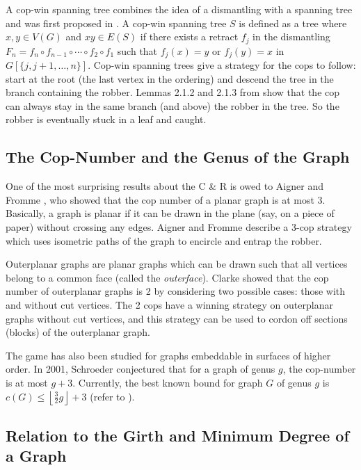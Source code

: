 A cop-win spanning tree combines the idea of a dismantling with a spanning tree
and was first proposed in \cite{clarke2002constrained}. A cop-win spanning tree $S$ is defined as a tree where $x,y\in V(G)$ and $xy \in E(S)$ if there exists a retract $f_j$ in the dismantling
$F_n = f_{n} \circ f_{n-1} \circ \cdots \circ f_{2} \circ f_1$ such that $f_j (x) = y$ or $f_j (y) = x$ in $G[\{j, j+1, \dots, n \}]$. Cop-win spanning trees give a strategy for the cops to follow: start at the root
(the last vertex in the ordering) and descend the tree in the branch containing the robber.
Lemmas 2.1.2 and 2.1.3 from \cite{clarke2002constrained} show that the cop
can always stay in the same branch (and above) the robber in the tree. So the
robber is eventually stuck in a leaf and caught.

\subsection{The Cop-Number and the Genus of the Graph}\label{intro cops and genus}

One of the most surprising results about the C \& R is owed to Aigner and Fromme \cite{aigner1984game}, who showed that the cop number of a planar graph is at most 3.
Basically, a graph is planar if it can be drawn in the plane (say, on a piece of paper) without crossing any edges. Aigner and Fromme describe a 3-cop strategy which uses isometric paths of the graph to encircle and entrap the robber.

Outerplanar graphs are planar graphs which can be drawn such that all vertices belong to a common face
(called the \textit{outerface}). Clarke \cite{clarke2002constrained} showed that the cop number of outerplanar graphs is 2 by considering
two possible cases: those with and without cut vertices. The 2 cops have a winning strategy on outerplanar graphs without cut vertices, and this strategy can be used to cordon off sections (blocks)
of the outerplanar graph.

The game has also been studied for graphs embeddable in surfaces of higher order.
In 2001, Schroeder conjectured \cite{bonato2017topological} that for a graph of genus $g$,
the cop-number is at most $g+3$. Currently, the best known bound for graph $G$ of genus $g$ is $c(G) \leq \left\lfloor \frac{3}{2}g \right\rfloor +3$ (refer to \cite{schroder2001copnumber}).

\subsection{Relation to the Girth and Minimum Degree of a Graph}

